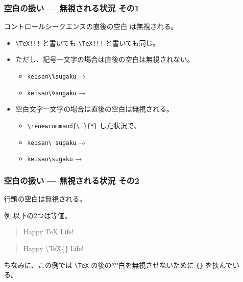 \documentclass{beamer}
\begin{document}
\begin{frame}[fragile]\frametitle{空白の扱い --- 無視される状況 その1}
  コントロールシークエンスの直後の空白%
は無視される。

  \begin{itemize}
  \item \verb|\TeX!!!| と書いても \texttt{\textbackslash TeX\ignoredspace!!!} と書いても同じ。
  \item ただし、記号一文字の場合は直後の空白は無視されない。
    \begin{itemize}
    \item \verb*|keisan\%sugaku| → 
    \item \texttt{keisan\textbackslash\%\textvisiblespace sugaku} → 
    \end{itemize}
  \item 空白文字一文字の場合は直後の空白は無視される。
    \begin{itemize}
    \item \verb*|\renewcommand{\ }{*}| した状況で、
    \item \verb*|keisan\ sugaku| → 
    \item \texttt{keisan\textbackslash\textvisiblespace\ignoredspace sugaku} → 
    \end{itemize}
  \end{itemize}
\end{frame}

\begin{frame}[fragile]\frametitle{空白の扱い --- 無視される状況 その2}
  行頭の空白は無視される。

  \begin{block}{例}
以下の2つは等価。
    \begin{quote}
\begin{MyCode}
Happy
\TeX{} Life!
\end{MyCode}
\end{quote}
    \begin{quote}
\begin{MyCodeAllTT}[showspaces]
Happy
\ignoredspace\ignoredspace\textbackslash{}TeX\{\} Life!
\end{MyCodeAllTT}
\end{quote}
  \end{block}
  ちなみに、この例では \verb|\TeX| の後の空白を無視させないために \verb|{}| を挟んでいる。
\end{frame}
\end{document}
